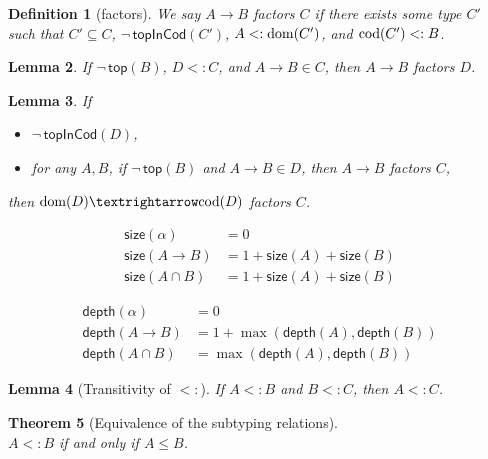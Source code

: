 \documentclass{article}
\newtheorem{theorem}{Theorem}
\newtheorem{lemma}[theorem]{Lemma}
\newtheorem{definition}[theorem]{Definition}
\begin{document}
\begin{definition}[factors]
  We say $A → B$ \emph{factors} $C$
  if there exists some type $C'$ such that
  $C' ⊆ C$, $\neg\,\mathsf{topInCod}(C')$, $A <: \mathrm{dom}(C')$, and $\mathrm{cod}(C') <: B$.
\end{definition}

\begin{lemma}\label{lem:sub-fun-inv}
  If $\neg\,\mathsf{top}(B)$,
  $D <: C$, and
  $A → B ∈ C$, then
  $A → B$ factors $D$.
\end{lemma}


\begin{lemma}\label{lem:sub-inv-trans}
  If
  \begin{itemize}
  \item $\neg\, \mathsf{topInCod}(D)$,
  \item for any $A,B$, if $\neg\,\mathsf{top}(B)$ and $A → B ∈ D$,
    then $A → B$ factors $C$,
  \end{itemize}
  then $\dom{D} → \cod{D}$ factors $C$.
\end{lemma}

\begin{align*}
  \mathsf{size}(\alpha) &= 0 \\
  \mathsf{size}(A → B) &= 1 + \mathsf{size}(A) + \mathsf{size}(B) \\
  \mathsf{size}(A ∩ B) &= 1 + \mathsf{size}(A) + \mathsf{size}(B)
\end{align*}

\begin{align*}
  \mathsf{depth}(\alpha) &= 0 \\
  \mathsf{depth}(A → B) &= 1 + \max(\mathsf{depth}(A), \mathsf{depth}(B)) \\
  \mathsf{depth}(A ∩ B) &= \max(\mathsf{depth}(A), \mathsf{depth}(B))
\end{align*}

\begin{lemma}[Transitivity of $<:$]\label{lem:sub-trans}
    If $A <: B$ and $B <: C$, then $A <: C$.
\end{lemma}


\begin{theorem}[Equivalence of the subtyping relations]\ \\
  $A <: B$ if and only if $A ≤ B$.
\end{theorem}

\clearpage
\pagebreak



\end{document}
